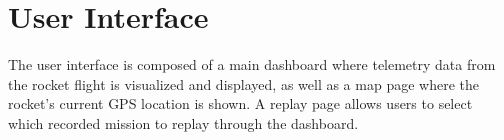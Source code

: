 \sectionfont{\fontsize{14}{14}\selectfont}
\section{User Interface}

The user interface is composed of a main dashboard where telemetry data from
the rocket flight is visualized and displayed, as well as a map
page where the rocket's current GPS location is shown. A replay
page allows users to select which recorded mission to replay 
through the dashboard.



